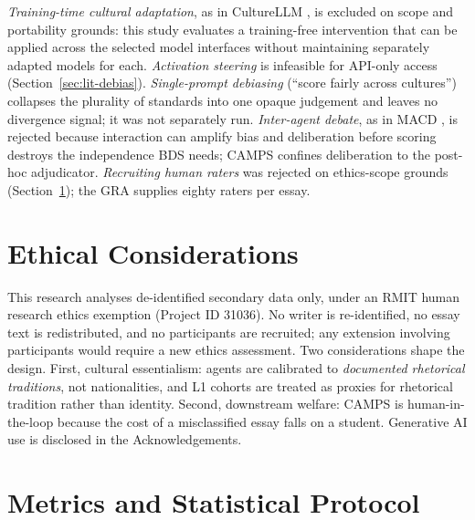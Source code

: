 \emph{Training-time cultural adaptation}, as in CultureLLM
\citep{li2024culturellm}, is excluded on scope and portability
grounds: this study evaluates a training-free intervention that can
be applied across the selected model interfaces without maintaining
separately adapted models for each. \emph{Activation steering} \citep{li2025fairsteer} is
infeasible for API-only access (Section~\ref{sec:lit-debias}).
\emph{Single-prompt debiasing} (``score fairly across cultures'')
collapses the plurality of standards into one opaque judgement and
leaves no divergence signal; it was not separately run.
\emph{Inter-agent debate}, as in MACD \citep{tan2026macd}, is
rejected because interaction can amplify bias \citep{mirza2025malibu}
and deliberation before scoring destroys the independence BDS
needs; CAMPS confines deliberation to the post-hoc adjudicator.
\emph{Recruiting human raters} was rejected on ethics-scope grounds
(Section~\ref{sec:ethics}); the GRA supplies eighty raters per essay.

\section{Ethical Considerations}
\label{sec:ethics}

This research analyses de-identified secondary data only, under an
RMIT human research ethics exemption (Project ID 31036). No writer
is re-identified, no essay text is redistributed, and no
participants are recruited; any extension involving participants
would require a new ethics assessment. Two considerations shape the design. First,
cultural essentialism: agents are calibrated to \emph{documented
rhetorical traditions}, not nationalities, and L1 cohorts are
treated as proxies for rhetorical tradition rather than identity.
Second, downstream welfare: CAMPS is human-in-the-loop because the
cost of a misclassified essay falls on a student. Generative AI use
is disclosed in the Acknowledgements.

\section{Metrics and Statistical Protocol}
\label{sec:metrics}

